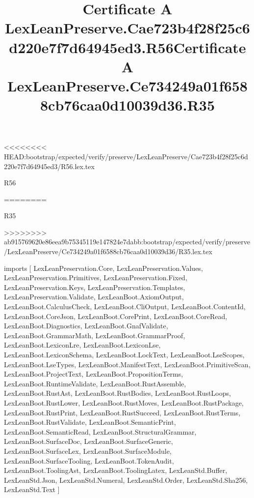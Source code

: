 <<<<<<<< HEAD:bootstrap/expected/verify/preserve/LexLeanPreserve/Cae723b4f28f25c6d220e7f7d64945ed3/R56.lex.tex
\begin{lexlean}{R56}
\title{Certificate A LexLeanPreserve.Cae723b4f28f25c6d220e7f7d64945ed3.R56}
========
\begin{lexlean}{R35}
\title{Certificate A LexLeanPreserve.Ce734249a01f6588cb76caa0d10039d36.R35}
>>>>>>>> ab915769620e86eea9b75345119e147824e7dabb:bootstrap/expected/verify/preserve/LexLeanPreserve/Ce734249a01f6588cb76caa0d10039d36/R35.lex.tex
\begin{coremodule}
imports [
  LexLeanPreservation.Core,
  LexLeanPreservation.Values,
  LexLeanPreservation.Primitives,
  LexLeanPreservation.Fixed,
  LexLeanPreservation.Keys,
  LexLeanPreservation.Templates,
  LexLeanPreservation.Validate,
  LexLeanBoot.AxiomOutput,
  LexLeanBoot.CalculusCheck,
  LexLeanBoot.CliOutput,
  LexLeanBoot.ContentId,
  LexLeanBoot.CoreJson,
  LexLeanBoot.CorePrint,
  LexLeanBoot.CoreRead,
  LexLeanBoot.Diagnostics,
  LexLeanBoot.GnafValidate,
  LexLeanBoot.GrammarMath,
  LexLeanBoot.GrammarProof,
  LexLeanBoot.LexiconLre,
  LexLeanBoot.LexiconLse,
  LexLeanBoot.LexiconSchema,
  LexLeanBoot.LockText,
  LexLeanBoot.LseScopes,
  LexLeanBoot.LseTypes,
  LexLeanBoot.ManifestText,
  LexLeanBoot.PrimitiveScan,
  LexLeanBoot.ProjectText,
  LexLeanBoot.PropositionTerms,
  LexLeanBoot.RuntimeValidate,
  LexLeanBoot.RustAssemble,
  LexLeanBoot.RustAst,
  LexLeanBoot.RustBodies,
  LexLeanBoot.RustLoops,
  LexLeanBoot.RustLower,
  LexLeanBoot.RustMoves,
  LexLeanBoot.RustPackage,
  LexLeanBoot.RustPrint,
  LexLeanBoot.RustSucceed,
  LexLeanBoot.RustTerms,
  LexLeanBoot.RustValidate,
  LexLeanBoot.SemanticPrint,
  LexLeanBoot.SemanticRead,
  LexLeanBoot.StructuralGrammar,
  LexLeanBoot.SurfaceDoc,
  LexLeanBoot.SurfaceGeneric,
  LexLeanBoot.SurfaceLex,
  LexLeanBoot.SurfaceModule,
  LexLeanBoot.SurfaceTooling,
  LexLeanBoot.TokenAudit,
  LexLeanBoot.ToolingAst,
  LexLeanBoot.ToolingLatex,
  LexLeanStd.Buffer,
  LexLeanStd.Json,
  LexLeanStd.Numeral,
  LexLeanStd.Order,
  LexLeanStd.Sha256,
  LexLeanStd.Text
]


\end{coremodule}
\end{lexlean}
\end{lexlean}
